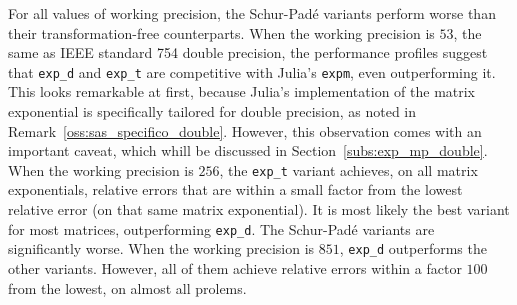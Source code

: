 For all values of working precision, the Schur-Padé variants perform worse than their transformation-free counterparts.
When the working precision is $53$, the same as \textsc{IEEE} standard 754 double precision, the performance profiles suggest that \texttt{exp\_d} and \texttt{exp\_t} are competitive with Julia's \texttt{expm}, even outperforming it. This looks remarkable at first, because Julia's implementation of the matrix exponential is specifically tailored for double precision, as noted in Remark~\ref{oss:sas_specifico_double}. However, this observation comes with an important caveat, which whill be discussed in Section~\ref{subs:exp_mp_double}. 
When the working precision is $256$, the \texttt{exp\_t} variant achieves, on all matrix exponentials, relative errors that are within a small factor from the lowest relative error (on that same matrix exponential). It is most likely the best variant for most matrices, outperforming \texttt{exp\_d}. The Schur-Padé variants are significantly worse.
When the working precision is $851$, \texttt{exp\_d} outperforms the other variants. However, all of them achieve relative errors within a factor $100$ from the lowest, on almost all prolems.

